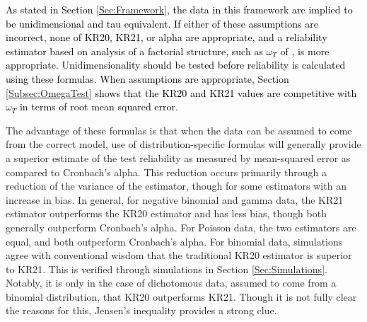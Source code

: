 \documentclass[12pt,epsfig]{article}
\newcommand{\changed}[1]{\textcolor{black}{#1}}
\begin{document}
\changed{As stated in Section \ref{Sec:Framework}, the data in this framework are implied to be unidimensional and tau equivalent. If either of these assumptions are incorrect, none of KR20, KR21, or alpha are appropriate, and a reliability estimator based on analysis of a factorial structure, such as $\omega_T$ of \cite{Mcdonald1999}, is more appropriate. Unidimensionality should be tested before reliability is calculated using these formulas. When assumptions are appropriate, Section \ref{Subsec:OmegaTest} shows that the KR20 and KR21 values are competitive with $\omega_T$ in terms of root mean squared error. }


The advantage of these formulas is that when the data can be assumed to come from the correct model, use of distribution-specific formulas will generally provide a superior estimate of the test reliability as measured by mean-squared error as compared to Cronbach's alpha. This reduction occurs primarily through a reduction of the variance of the estimator, though for some estimators with an increase in bias. In general, for negative binomial and gamma data, the KR21 estimator outperforms the KR20 estimator and has less bias, though both generally outperform Cronbach's alpha. For Poisson data, the two estimators are equal, and both outperform Cronbach's alpha. For binomial data, simulations agree with conventional wisdom that the traditional KR20 estimator is superior to KR21. This is verified through simulations in Section \ref{Sec:Simulations}. Notably, it is only in the case of dichotomous data, assumed to come from a binomial distribution, that KR20 outperforms KR21. Though it is not fully clear the reasons for this, Jensen's inequality provides a strong clue.
\end{document}
